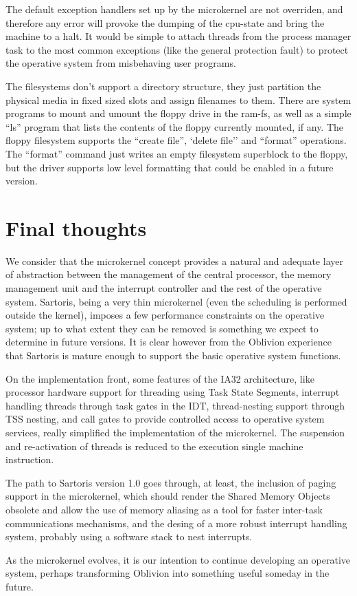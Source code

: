 \documentclass[11pt, letterpaper, twoside, english]{book}
\begin{document}
The default exception handlers set up by the microkernel are not overriden, and therefore any error will provoke the dumping of the cpu-state and bring the machine to a halt. It would be simple to attach threads from the process manager task to the most common exceptions (like the general protection fault) to protect the operative system from misbehaving user programs.

The filesystems don't support a directory structure, they just partition the physical media in fixed sized slots and assign filenames to them. There are system programs to mount and umount the floppy drive in the ram-fs, as well as a simple ``ls'' program that lists the contents of the floppy currently mounted, if any. The floppy filesystem supports the ``create file'', `delete file'' and ``format'' operations. The ``format'' command just writes an empty filesystem superblock to the floppy, but the driver supports low level formatting that could be enabled in a future version.

\chapter{Final thoughts}

We consider that the microkernel concept provides a natural and adequate layer of abstraction between the management of the central processor, the memory management unit and the interrupt controller and the rest of the operative system. Sartoris, being  a very thin microkernel (even the scheduling is performed outside the kernel), imposes a few performance constraints on the operative system; up to what extent they can be removed is something we expect to determine in future versions. It is clear however from the Oblivion experience that Sartoris is mature enough to support the basic operative system functions.

On the implementation front, some features of the IA32 architecture, like processor hardware support for threading using Task State Segments, interrupt handling threads through task gates in the IDT, thread-nesting support through TSS nesting, and call gates to provide controlled access to operative system services, really simplified the implementation of the microkernel. The suspension and re-activation of threads is reduced to the execution single machine instruction.

The path to Sartoris version 1.0 goes through, at least, the inclusion of paging support in the microkernel, which should render the Shared Memory Objects obsolete and allow the use of memory aliasing as a tool for faster inter-task communications mechanisms, and the desing of a more robust interrupt handling system, probably using a software stack to nest interrupts.

As the microkernel evolves, it is our intention to continue developing an operative system, perhaps transforming Oblivion into something useful someday in the future.
\end{document}
